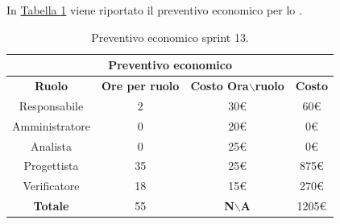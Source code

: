 In \hyperref[tab:sprint13_preventivo_economico]{Tabella \ref{tab:sprint13_preventivo_economico}} viene riportato il preventivo economico per lo .
\begin{table}[H]
    \centering
    \begin{tabular}{|c|c|c|c|}
        \hline
            \multicolumn{4}{|c|}{\textbf{Preventivo economico}} \\ 
        \hline
            \textbf{Ruolo} & \textbf{Ore per ruolo} & \textbf{Costo Ora$\backslash$ruolo} & \textbf{Costo} \\
        \hline
        Responsabile & 2 & 30€ & 60€ \\
        \hline
        Amministratore & 0 & 20€ & 0€ \\
        \hline
        Analista & 0 & 25€ & 0€ \\
        \hline
        Progettista & 35 & 25€ & 875€ \\
        \hline
        Verificatore & 18 & 15€ & 270€ \\
        \hline 
        \textbf{Totale} & 55 & \textbf{N$\backslash$A} & 1205€  \\
        \hline
    \end{tabular}
    \caption{Preventivo economico sprint 13.}
    \label{tab:sprint13_preventivo_economico}
\end{table}
